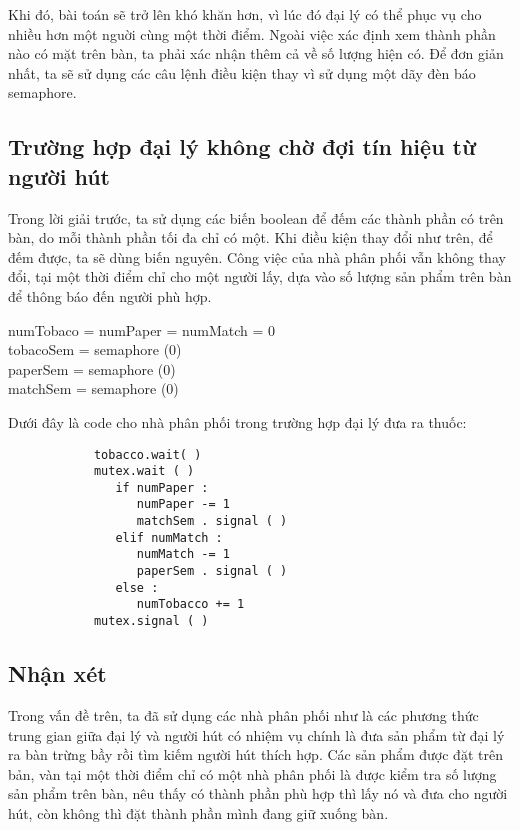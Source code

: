 \documentclass[a4paper]{article}
\begin{document}
	Khi đó, bài toán sẽ trở lên khó khăn hơn, vì lúc đó đại lý có thể phục vụ cho nhiều hơn một nguời cùng một
	thời điểm. Ngoài việc xác định xem thành phần nào có mặt trên bàn, ta phải xác nhận thêm cả về số
	lượng hiện có. Để đơn giản nhất, ta sẽ sử dụng các câu lệnh điều kiện thay vì sử dụng một dãy đèn báo semaphore. 

	\subsection{Trường hợp đại lý không chờ đợi tín hiệu từ người hút}

	Trong lời giải trước, ta sử dụng các biến boolean để đếm các thành phần có trên bàn, do mỗi thành phần
	tối đa chỉ có một. Khi điều kiện thay đổi như trên, để đếm được, ta sẽ dùng biến nguyên. Công việc của 
	nhà phân phối vẫn không thay đổi, tại một thời điểm chỉ cho một người lấy, dựa vào số lượng sản phẩm 
	trên bàn để thông báo đến người phù hợp.

	\begin{tcolorbox}
	numTobaco = numPaper = numMatch = 0 \\
	tobacoSem = semaphore (0) \\
	paperSem = semaphore (0) \\
	matchSem = semaphore (0)
	\end{tcolorbox}

	Dưới đây là code cho nhà phân phối trong trường hợp đại lý đưa ra thuốc:

	\begin{tcolorbox}
		\begin{verbatim}
		 	tobacco.wait( )
			mutex.wait ( )
			   if numPaper :
			      numPaper -= 1
			      matchSem . signal ( )
			   elif numMatch :
			      numMatch -= 1
			      paperSem . signal ( )
			   else :
			      numTobacco += 1
			mutex.signal ( )
		\end{verbatim}
	\end{tcolorbox}	
	
	\subsection{Nhận xét}
	Trong vấn đề trên, ta đã sử dụng các nhà phân phối như là các phương thức trung gian giữa đại lý và người hút 
	có nhiệm vụ chính là đưa sản phẩm từ đại lý ra bàn trừng bầy rồi tìm kiếm người hút thích hợp. Các sản phẩm được đặt trên bản, vàn tại một thời điểm chỉ 
	có một nhà phân phối là được kiểm tra số lượng sản phẩm trên bàn, nêu thấy có thành phần phù hợp thì lấy nó và
	đưa cho người hút, còn không thì đặt thành phần mình đang giữ xuống bàn. 
	
\end{document}
